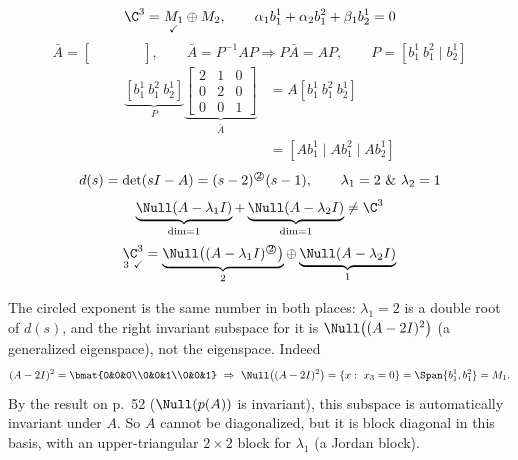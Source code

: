 \begin{example}
\[
\C^3=\underset{\checkmark}{M_1}\oplus M_2,\qquad
\alpha_1b_1^1+\alpha_2b_1^2+\beta_1b_2^1=0
\]
\[
\bar{A}=\left[\begin{array}{cc|c}\ \ &\ \ &\ \ \\ \ &\ &\ \\\hline\ &\ &\ \end{array}\right],
\qquad
\bar{A}=P^{-1}AP\Rightarrow P\bar{A}=AP,
\qquad
P=[b_1^1\ b_1^2\mid b_2^1]
\]
\begin{align*}
\underbrace{[b_1^1\ b_1^2\ b_2^1]}_{P}
\underbrace{\left[\begin{array}{cc|c}2&1&0\\0&2&0\\\hline0&0&1\end{array}\right]}_{\bar{A}}
&=A[b_1^1\ b_1^2\ b_2^1]\\
&=[Ab_1^1\mid Ab_1^2\mid Ab_2^1]
\end{align*}
\[
d(s)=\det(sI-A)=(s-2)^{\text{\textcircled{\scriptsize 2}}}(s-1),\qquad\lambda_1=2\ \&\ \lambda_2=1
\]
\[
\underbrace{\Null(A-\lambda_1I)}_{\dim=1}+\underbrace{\Null(A-\lambda_2I)}_{\dim=1}\neq\C^3
\]
\[
\underset{3\ \checkmark}{\C^3}=\underbrace{\Null\big((A-\lambda_1I)^{\text{\textcircled{\scriptsize 2}}}\big)}_{2}\oplus\underbrace{\Null(A-\lambda_2I)}_{1}
\]
\begin{insight}
The circled exponent is the same number in both places: $\lambda_1=2$ is a double root of $d(s)$, and the right invariant subspace for it is $\Null\big((A-2I)^2\big)$ (a generalized eigenspace), not the eigenspace. Indeed
\[
(A-2I)^2=\bmat{0&0&0\\0&0&1\\0&0&1}\ \Rightarrow\ \Null\big((A-2I)^2\big)=\{x:\ x_3=0\}=\Span\{b_1^1,b_1^2\}=M_1 .
\]
By the result on p.~52 ($\Null(p(A))$ is invariant), this subspace is automatically invariant under $A$. So $A$ cannot be diagonalized, but it is block diagonal in this basis, with an upper-triangular $2\times2$ block for $\lambda_1$ (a Jordan block).
\end{insight}
\end{example}

